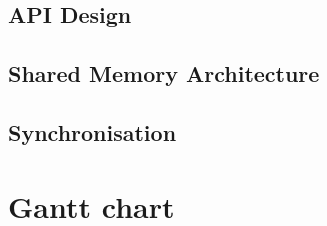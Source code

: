 \documentclass[final]{cmpreport}
\begin{document}
\subsection{API Design}

\subsection{Shared Memory Architecture}

\subsection{Synchronisation}




\appendix
\clearpage

\clearpage
\section{Gantt chart} \label{ApB}
\end{document}
